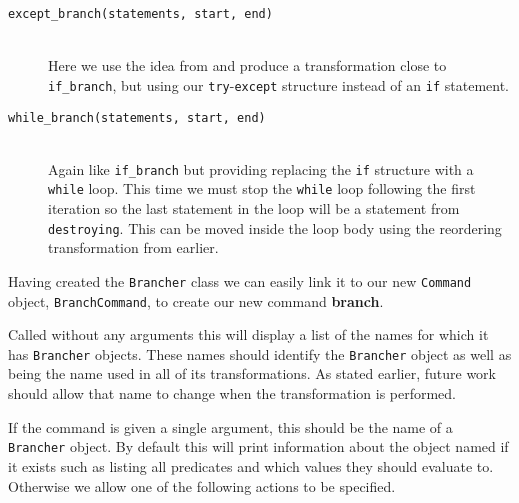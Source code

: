 \documentclass[twoside,a4paper]{report}
\begin{document}
\begin{description}
\item[\texttt{except\_branch(statements, start, end)}] \hfill \\
Here we use the idea from \cite{exceptionpred} and produce a transformation close to \texttt{if\_branch}, but using our \texttt{try}-\texttt{except} structure
instead of an \texttt{if} statement.

\item[\texttt{while\_branch(statements, start, end)}] \hfill \\
Again like \texttt{if\_branch} but providing replacing the \texttt{if} structure with a \texttt{while} loop. This time we must stop the \texttt{while} loop following
the first iteration so the last statement in the loop will be a statement from \texttt{destroying}. This can be moved inside the loop body using the reordering
transformation from earlier.
\end{description}

Having created the \texttt{Brancher} class we can easily link it to our new \texttt{Command} object, \texttt{BranchCommand}, to create our new command
\textbf{branch}.

Called without any arguments this will display a list of the names for which it has \texttt{Brancher} objects. These names should identify the \texttt{Brancher}
object as well as being the name used in all of its transformations. As stated earlier, future work should allow that name to change when the transformation
is performed.

If the command is given a single argument, this should be the name of a \texttt{Brancher} object. By default this will print information about the object named
if it exists such as listing all predicates and which values they should evaluate to. Otherwise we allow one of the following actions to be specified.
\end{document}
